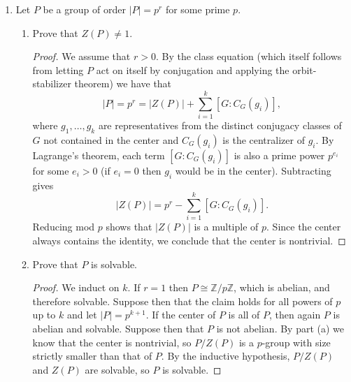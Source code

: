 \documentclass[11pt,letterpaper]{report}
\newcommand{\integers}{\mathbb{Z}}
\newenvironment{solution}
{\begin{proof}[Solution]}
{\end{proof}}
\begin{document}
\begin{enumerate}
\begin{solution}
		\noindent $\integers/2018\integers$ and the dihedral group of order 2018, $D_{1009}$, are two non-isomorphic ($D_{1009}$ is non-abelian by looking at its standard presentation) groups of order 2018, so this must be a complete list of such groups.
	\end{solution}
	\item Let $P$ be a group of order $|P|=p^r$ for some prime $p$.
	\begin{enumerate}
		\item Prove that $Z(P)\neq 1$.
		\begin{proof}
			We assume that $r>0$. By the class equation (which itself follows from letting $P$ act on itself by conjugation and applying the orbit-stabilizer theorem) we have that
			\[
			|P| = p^r = |Z(P)| + \sum_{i=1}^k[G: C_G(g_i)],
			\]
			where $g_1, \ldots, g_k$ are representatives from the distinct conjugacy classes of $G$ not contained in the center and $C_G(g_i)$ is the centralizer of $g_i$. By Lagrange's theorem, each term $[G: C_G(g_i)]$ is also a prime power $p^{e_i}$ for some $e_i>0$ (if $e_i = 0$ then $g_i$ would be in the center). Subtracting gives
			\[
				|Z(P)| = p^r - \sum_{i=1}^k[G: C_G(g_i)].
			\] 
			Reducing mod $p$ shows that $|Z(P)|$ is a multiple of $p$. Since the center always contains the identity, we conclude that the center is nontrivial.
		\end{proof}
		\item Prove that $P$ is solvable.
		\begin{proof}
			We induct on $k$. If $r=1$ then $P \cong \integers/p\integers$, which is abelian, and therefore solvable. Suppose then that the claim holds for all powers of $p$ up to $k$ and let $|P| = p^{k+1}$. If the center of $P$ is all of $P$, then again $P$ is abelian and solvable. Suppose then that $P$ is not abelian. By part (a) we know that the center is nontrivial, so $P/Z(P)$ is a $p$-group with size strictly smaller than that of $P$. By the inductive hypothesis, $P/Z(P)$ and $Z(P)$ are solvable, so $P$ is solvable.
		\end{proof}
	\end{enumerate}


\end{enumerate}
\end{document}
